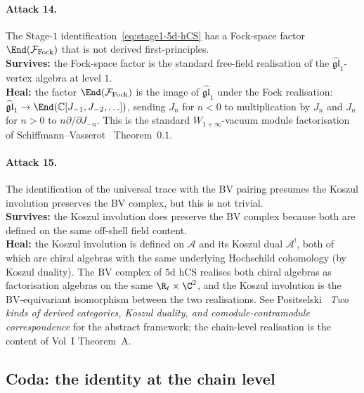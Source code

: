 \paragraph{Attack 14.}
The Stage-$1$ identification~\eqref{eq:stage1-5d-hCS} has a
Fock-space factor $\End(\mathcal{F}_{\mathrm{Fock}})$ that is not
derived first-principles. \\
\textbf{Survives:} the Fock-space factor is the standard
free-field realisation of the $\widehat{\mathfrak{gl}}_1$-vertex
algebra at level $1$. \\
\textbf{Heal:} the factor $\End(\mathcal{F}_{\mathrm{Fock}})$ is the
image of $\widehat{\mathfrak{gl}}_1$ under the Fock realisation:
$\widehat{\mathfrak{gl}}_1 \to \End(\mathbb{C}[J_{-1}, J_{-2},
\ldots])$, sending $J_n$ for $n < 0$ to multiplication by $J_n$ and
$J_n$ for $n > 0$ to $n\partial/\partial J_{-n}$. This is the standard
$W_{1+\infty}$-vacuum module factorisation of
Schiffmann--Vasserot~\cite{SchiffmannVasserot2013} Theorem~$0.1$.

\paragraph{Attack 15.}
The identification of the universal trace with the BV pairing
presumes the Koszul involution preserves the BV complex, but this is
not trivial. \\
\textbf{Survives:} the Koszul involution does preserve the BV complex
because both are defined on the same off-shell field content. \\
\textbf{Heal:} the Koszul involution is defined on
$\mathcal{A}$ and its Koszul dual $\mathcal{A}^!$, both of which are
chiral algebras with the same underlying Hochschild cohomology (by
Koszul duality). The BV complex of $5$d hCS realises both chiral
algebras as factorisation algebras on the same $\R_t\times\C^2$, and
the Koszul involution is the BV-equivariant isomorphism between the
two realisations. See Positselski~\cite{Positselski2011}
\emph{Two kinds of derived categories, Koszul duality, and
comodule-contramodule correspondence} for the abstract framework;
the chain-level realisation is the content of Vol~I Theorem~A.

\subsection*{Coda: the identity at the chain level}

